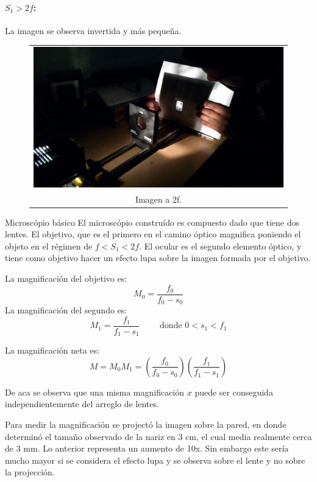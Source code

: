 \documentclass[addpoints,10pt]{exam}
\begin{document}
\begin{questions}
		\paragraph{$S_1 > 2f$:}
			La imagen se observa invertida y m\'as peque\~na.
			\begin{figure}[h]
				\centering
				\begin{tabular}{c}
					\includegraphics[width = 0.7\linewidth]{normal.jpeg} \\
					Imagen a 2f.
				\end{tabular}
				
			\end{figure}
			
		{\question Microsc\'opio b\'asico}
		El microsc\'opio constru\'ido es compuesto dado que tiene dos lentes. El objetivo, que es el primero en el camino \'optico magnifica poniendo el objeto en el r\'egimen de $f < S_1 < 2f$. El ocular es el segundo elemento \'optico, y tiene como objetivo hacer un efecto lupa sobre la imagen formada por el objetivo.
		
		La magnificaci\'on del objetivo es:
		\begin{equation}
			M_0 = \dfrac{f_0}{f_0 - s_0}
		\end{equation} 
		La magnificaci\'on del segundo es:
		\begin{equation}
			M_1 = \dfrac{f_1}{f_1 - s_1} \qquad \text{ donde $0<s_1<f_1$}
		\end{equation}
		
		La magnificaci\'on neta es:
		\begin{equation}
			M = M_0M_1 = \left(\dfrac{f_0}{f_0 - s_0}\right) \left(\dfrac{f_1}{f_1 - s_1}\right)
		\end{equation}
		
		De aca se observa que una misma magnificaci\'on $x$ puede ser conseguida independientemente del arreglo de lentes.
		
		Para medir la magnificaci\'on se project\'o la imagen sobre la pared, en donde determin\'o el tama\~no observado de la nariz en 3 cm, el cual media realmente cerca de 3 mm. Lo anterior representa un aumento de 10x. Sin embargo este ser\'ia mucho mayor si se considera el efecto lupa y se observa sobre el lente y no sobre la projecci\'on.
		
		
	\end{questions}
	
	
\end{document}
